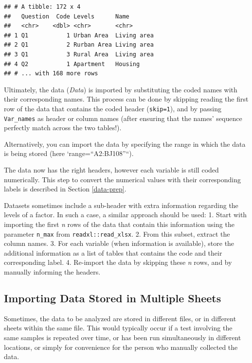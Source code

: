 \documentclass[
]{krantz}
\renewenvironment{quote}{\begin{VF}}{\end{VF}}
\begin{document}
\begin{verbatim}
## # A tibble: 172 x 4
##   Question  Code Levels      Name       
##   <chr>    <dbl> <chr>       <chr>      
## 1 Q1           1 Urban Area  Living area
## 2 Q1           2 Rurban Area Living area
## 3 Q1           3 Rural Area  Living area
## 4 Q2           1 Apartment   Housing    
## # ... with 168 more rows
\end{verbatim}

Ultimately, the data (\emph{Data}) is imported by substituting the coded names with their corresponding names. This process can be done by skipping reading the first row of the data that contains the coded header (\texttt{skip=1}), and by passing \texttt{Var\_names} as header or column names (after ensuring that the names' sequence perfectly match across the two tables!).

Alternatively, you can import the data by specifying the range in which the data is being stored (here `range=``A2:BJ108''``).

The data now has the right headers, however each variable is still coded numerically. This step to convert the numerical values with their corresponding labels is described in Section \ref{data-prep}.

\begin{quote}
Datasets sometimes include a sub-header with extra information regarding the levels of a factor. In such a case, a similar approach should be used:
1. Start with importing the first \emph{n} rows of the data that contain this information using the parameter \texttt{n\_max} from \texttt{readxl::read\_xlsx}.
2. From this subset, extract the column names.
3. For each variable (when information is available), store the additional information as a list of tables that contains the code and their corresponding label.
4. Re-import the data by skipping these \emph{n} rows, and by manually informing the headers.
\end{quote}

\hypertarget{import-mult-sheet}{%
\subsection{Importing Data Stored in Multiple Sheets}\label{import-mult-sheet}}

Sometimes, the data to be analyzed are stored in different files, or in different sheets within the same file. This would typically occur if a test involving the same samples is repeated over time, or has been run simultaneously in different locations, or simply for convenience for the person who manually collected the data.
\end{document}

